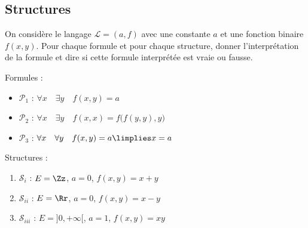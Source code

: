 \documentclass[11pt,class=report,crop=false]{standalone}
\begin{document}
\subsection*{Structures}

\begin{exercicecours}
	On considère le langage $\mathcal{L} = (a, f)$ avec une constante $a$ et une fonction binaire $f(x,y)$.
	Pour chaque formule et pour chaque structure, donner l'interprétation de la formule et dire si cette formule interprétée est vraie ou fausse.	
	
	Formules :
	\begin{itemize}
		\item $\mathcal{P}_1$ : $\forall x \quad \exists y \quad f(x,y) = a$
		
		\item $\mathcal{P}_2$ : $\forall x \quad \exists y \quad f(x,x) = f\big( f(y,y), y\big)$
		
		\item $\mathcal{P}_3$ : $\forall x \quad \forall y \quad f(x,y) = a \limplies x =a$
	\end{itemize}
	
	Structures :
	\begin{enumerate}
		\item $\mathcal{S}_i$ : $E=\Zz$, $a=0$, $f(x,y) = x+y$
		
		\item $\mathcal{S}_{ii}$ : $E=\Rr$, $a=0$, $f(x,y) = x-y$
		
		\item $\mathcal{S}_{iii}$ : $E= {}]0,+\infty[$, $a=1$, $f(x,y) = xy$
	\end{enumerate}
\end{exercicecours}
\end{document}
